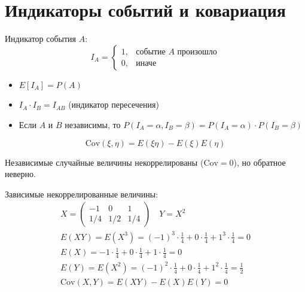 \section{Индикаторы событий и ковариация}

\begin{definition}
\leavevmode

Индикатор события $A$:
$$ I_A = \begin{cases} 1, & \text{событие } A \text{ произошло} \\ 0, & \text{иначе} \end{cases} $$
\end{definition}

\begin{statement}
\leavevmode

\begin{itemize}
    \item $E[I_A] = P(A)$
    \item $I_A \cdot I_B = I_{AB}$ (индикатор пересечения)
    \item Если $A$ и $B$ независимы, то $P(I_A = \alpha, I_B = \beta) = P(I_A = \alpha) \cdot P(I_B = \beta)$
\end{itemize}
\end{statement}

\begin{definition}[Ковариация]
\leavevmode

$$ \text{Cov}(\xi, \eta) = E(\xi \eta) - E(\xi) E(\eta) $$
\end{definition}

\begin{statement}
Независимые случайные величины некоррелированы ($\text{Cov} = 0$), но обратное неверно.
\end{statement}

\begin{example} Зависимые некоррелированные величины:
\begin{gather*}
X = \begin{pmatrix} -1 & 0 & 1 \\ 1/4 & 1/2 & 1/4 \end{pmatrix} \quad Y = X^2 \\
E(XY) = E(X^3) = (-1)^3 \cdot \frac{1}{4} + 0 \cdot \frac{1}{4} + 1^3 \cdot \frac{1}{4} = 0\\
E(X) = -1 \cdot \frac{1}{4} + 0 \cdot \frac{1}{4} + 1 \cdot \frac{1}{4} = 0\\
E(Y) = E(X^2) = (-1)^2 \cdot \frac{1}{4} + 0 \cdot \frac{1}{4} + 1^2 \cdot \frac{1}{4} = \frac{1}{2}\\
\text{Cov}(X, Y) = E(X Y) - E(X) E(Y) = 0
\end{gather*}

\end{example}


